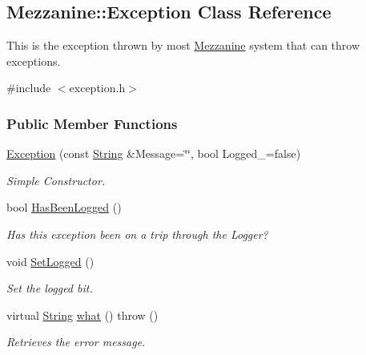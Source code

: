 \hypertarget{classMezzanine_1_1Exception}{
\subsection{Mezzanine::Exception Class Reference}
\label{classMezzanine_1_1Exception}
}


This is the exception thrown by most \hyperlink{namespaceMezzanine}{Mezzanine} system that can throw exceptions.  




{\ttfamily \#include $<$exception.h$>$}

\subsubsection*{Public Member Functions}
\begin{DoxyCompactItemize}
\item 
\hyperlink{classMezzanine_1_1Exception_ad8659eac607c0e9138be934281b4102d}{Exception} (const \hyperlink{namespaceMezzanine_acf9fcc130e6ebf08e3d8491aebcf1c86}{String} \&Message=\char`\"{}\char`\"{}, bool Logged\_\-=false)
\begin{DoxyCompactList}\small\item\em Simple Constructor. \item\end{DoxyCompactList}\item 
bool \hyperlink{classMezzanine_1_1Exception_a642c76c7148c92b09802a55600359d3c}{HasBeenLogged} ()
\begin{DoxyCompactList}\small\item\em Has this exception been on a trip through the Logger? \item\end{DoxyCompactList}\item 
\hypertarget{classMezzanine_1_1Exception_a574150adbe4f949a5668640a7225ca8c}{
void \hyperlink{classMezzanine_1_1Exception_a574150adbe4f949a5668640a7225ca8c}{SetLogged} ()}
\label{classMezzanine_1_1Exception_a574150adbe4f949a5668640a7225ca8c}

\begin{DoxyCompactList}\small\item\em Set the logged bit. \item\end{DoxyCompactList}\item 
virtual \hyperlink{namespaceMezzanine_acf9fcc130e6ebf08e3d8491aebcf1c86}{String} \hyperlink{classMezzanine_1_1Exception_adfca1d69742135b428879136456e1126}{what} ()  throw ()
\begin{DoxyCompactList}\small\item\em Retrieves the error message. \item\end{DoxyCompactList}\end{DoxyCompactItemize}


